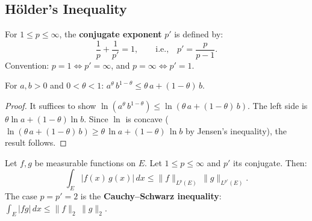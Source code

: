 \documentclass[11pt]{report}
\begin{document}
\subsection{H\"older's Inequality}

\begin{defbox}
For $1 \leq p \leq \infty$, the \textbf{conjugate exponent} $p'$ is defined by:
\[
\frac{1}{p} + \frac{1}{p'} = 1, \qquad \text{i.e.,} \quad p' = \frac{p}{p - 1}.
\]
Convention: $p = 1 \Leftrightarrow p' = \infty$, and $p = \infty \Leftrightarrow p' = 1$.
\end{defbox}

\begin{lembox}
For $a, b > 0$ and $0 < \theta < 1$: $a^\theta\,b^{1-\theta} \leq \theta\,a + (1 - \theta)\,b$.
\end{lembox}

\begin{proof}
It suffices to show $\ln(a^\theta\,b^{1-\theta}) \leq \ln(\theta\,a + (1 - \theta)\,b)$. The left side is $\theta\ln a + (1-\theta)\ln b$. Since $\ln$ is concave ($\ln(\theta\,a + (1 - \theta)\,b) \geq \theta\,\ln a + (1 - \theta)\,\ln b$ by Jensen's inequality), the result follows.
\end{proof}

\begin{thmbox}
Let $f, g$ be measurable functions on $E$. Let $1 \leq p \leq \infty$ and $p'$ its conjugate. Then:
\[
\int_E |f(x)\,g(x)|\,dx \leq \|f\|_{L^p(E)}\,\|g\|_{L^{p'}(E)}.
\]
The case $p = p' = 2$ is the \textbf{Cauchy--Schwarz inequality}: $\int_E |fg|\,dx \leq \|f\|_2\,\|g\|_2$.
\end{thmbox}
\end{document}
